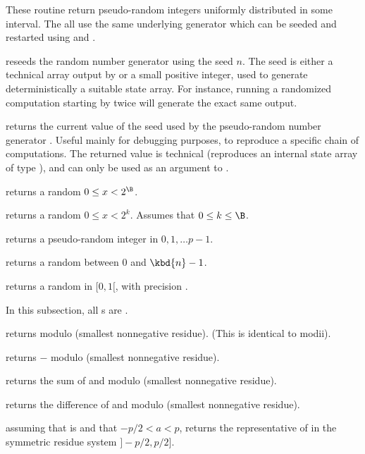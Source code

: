 These routine return pseudo-random integers uniformly distributed in some
interval. The all use the same underlying generator which can be seeded and
restarted using  and .

 reseeds the random number generator using the
seed $n$. The seed is either a technical array output by 
or a small positive integer, used to generate deterministically a suitable
state array. For instance, running a randomized computation starting by
 twice will generate the exact same output.

 returns the current value of the seed used by the
pseudo-random number generator . Useful mainly for debugging
purposes, to reproduce a specific chain of computations. The returned value
is technical (reproduces an internal state array of type ),
and can only be used as an argument to .

 returns a random $0 \leq x < 2^\B$.

 returns a random $0 \leq x < 2^k$. Assumes
that $0 \leq k \leq \B$.

 returns a pseudo-random integer
in $0, 1, \dots p-1$.

 returns a random  between $0$ and $\kbd{n}
- 1$.

 returns a random  in $[0,1[$, with
precision .

 In this subsection, all s are
.

 returns  modulo  (smallest
nonnegative residue). (This is identical to modii).

 returns $-$ modulo  (smallest
nonnegative residue).

 returns the sum of  and
 modulo  (smallest nonnegative residue).

 returns the difference of  and
 modulo  (smallest nonnegative residue).

 assuming that  is
 and that $-p/2 < a < p$, returns the representative of
 in the symmetric residue system $]-p/2,p/2]$.

